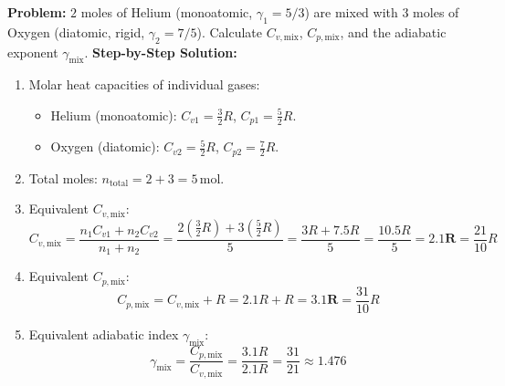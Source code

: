 \documentclass[10pt,a4paper]{article}
\begin{document}
\begin{usecasebox}
\textbf{Problem:} $2$ moles of Helium (monoatomic, $\gamma_1 = 5/3$) are mixed with $3$ moles of Oxygen (diatomic, rigid, $\gamma_2 = 7/5$). Calculate $C_{v,\text{mix}}$, $C_{p,\text{mix}}$, and the adiabatic exponent $\gamma_{\text{mix}}$.
\textbf{Step-by-Step Solution:}
\begin{enumerate}
  \item Molar heat capacities of individual gases:
  \begin{itemize}
    \item Helium (monoatomic): $C_{v1} = \frac{3}{2}R$, $C_{p1} = \frac{5}{2}R$.
    \item Oxygen (diatomic): $C_{v2} = \frac{5}{2}R$, $C_{p2} = \frac{7}{2}R$.
  \end{itemize}
  \item Total moles: $n_{\text{total}} = 2 + 3 = 5\,\mathrm{mol}$.
  \item Equivalent $C_{v,\text{mix}}$:
  \begin{equation}
    C_{v,\text{mix}} = \frac{n_1 C_{v1} + n_2 C_{v2}}{n_1 + n_2} = \frac{2 \left(\frac{3}{2}R\right) + 3 \left(\frac{5}{2}R\right)}{5} = \frac{3R + 7.5R}{5} = \frac{10.5R}{5} = \mathbf{2.1 R} = \frac{21}{10}R
  \end{equation}
  \item Equivalent $C_{p,\text{mix}}$:
  \begin{equation}
    C_{p,\text{mix}} = C_{v,\text{mix}} + R = 2.1 R + R = \mathbf{3.1 R} = \frac{31}{10}R
  \end{equation}
  \item Equivalent adiabatic index $\gamma_{\text{mix}}$:
  \begin{equation}
    \gamma_{\text{mix}} = \frac{C_{p,\text{mix}}}{C_{v,\text{mix}}} = \frac{3.1 R}{2.1 R} = \frac{31}{21} \approx \mathbf{1.476}
  \end{equation}
\end{enumerate}
\end{usecasebox}
\end{document}
